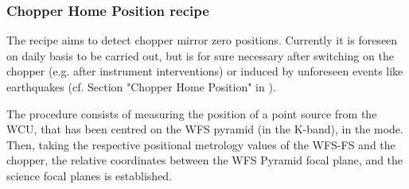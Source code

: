 \clearpage
\subsubsection{Chopper Home Position recipe }\label{ssec:metisimgchophome}
The recipe \hyperref[rec:metis_img_chophome]{} aims to detect chopper mirror zero positions. Currently it is foreseen on daily basis to be carried out, but is for sure necessary after switching on the chopper (e.g. after instrument interventions) or induced by unforeseen events like earthquakes (cf. Section "Chopper Home Position" in  \cite{METIS-calibration_plan}).

The procedure consists of measuring the position of a point source from the \ac{WCU}, that has been centred on the \ac{WFS} pyramid (in the K-band), in the  mode.
Then, taking the respective positional metrology values of the \ac{WFS}-FS and the chopper,
the relative coordinates between the \ac{WFS} Pyramid focal plane, and the science focal planes is established.

